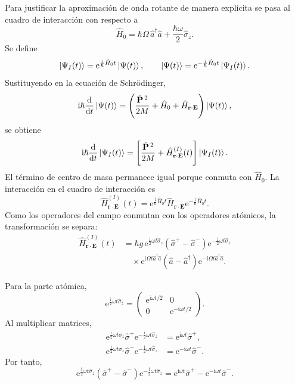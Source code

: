 \documentclass[11pt]{article}
\newcommand{\ii}{\mathrm{i}}
\newcommand{\ee}{\mathrm{e}}
\newcommand{\dd}{\mathrm{d}}
\newcommand{\vb}[1]{\mathbf{#1}}
\newcommand{\adag}{\hat a^\dagger}
\newcommand{\splus}{\hat\sigma^+}
\newcommand{\sminus}{\hat\sigma^-}
\begin{document}
Para justificar la aproximaci\'on de onda rotante de manera expl\'icita se pasa
al cuadro de interacci\'on con respecto a
\begin{equation}
  \hat H_0
  =
  \hbar\Omega\,\adag\hat a
  +
  \frac{\hbar\omega}{2}\hat\sigma_z.
\end{equation}
Se define
\begin{equation}
  \ket{\Psi_I(t)}
  =
  \ee^{\frac{\ii}{\hbar}\hat H_0t}
  \ket{\Psi(t)},
  \qquad
  \ket{\Psi(t)}
  =
  \ee^{-\frac{\ii}{\hbar}\hat H_0t}
  \ket{\Psi_I(t)}.
\end{equation}
Sustituyendo en la ecuaci\'on de Schr\"odinger,
\begin{equation}
  \ii\hbar\frac{\dd}{\dd t}\ket{\Psi(t)}
  =
  \left(
    \frac{\hat{\vb P}^{\,2}}{2M}
    +
    \hat H_0
    +
    \hat H_{\vb r\cdot\vb E}
  \right)
  \ket{\Psi(t)},
\end{equation}
se obtiene
\begin{equation}
  \ii\hbar\frac{\dd}{\dd t}\ket{\Psi_I(t)}
  =
  \left[
    \frac{\hat{\vb P}^{\,2}}{2M}
    +
    \hat H_{\vb r\cdot\vb E}^{(I)}(t)
  \right]
  \ket{\Psi_I(t)}.
\end{equation}
El t\'ermino de centro de masa permanece igual porque conmuta con
\(\hat H_0\). La interacci\'on en el cuadro de interacci\'on es
\begin{equation}
  \hat H_{\vb r\cdot\vb E}^{(I)}(t)
  =
  \ee^{\frac{\ii}{\hbar}\hat H_0t}
  \hat H_{\vb r\cdot\vb E}
  \ee^{-\frac{\ii}{\hbar}\hat H_0t}.
\end{equation}
Como los operadores del campo conmutan con los operadores at\'omicos, la
transformaci\'on se separa:
\begin{align}
  \hat H_{\vb r\cdot\vb E}^{(I)}(t)
  &=
  \hbar g\,
  \ee^{\frac{\ii}{2}\omega t\hat\sigma_z}
  (\splus-\sminus)
  \ee^{-\frac{\ii}{2}\omega t\hat\sigma_z}                                   \\
  &\quad\times
  \ee^{\ii\Omega t\adag\hat a}
  (\hat a-\adag)
  \ee^{-\ii\Omega t\adag\hat a}.
\end{align}

Para la parte at\'omica,
\begin{equation}
  \ee^{\frac{\ii}{2}\omega t\hat\sigma_z}
  =
  \begin{pmatrix}
    \ee^{\ii\omega t/2}&0\\
    0&\ee^{-\ii\omega t/2}
  \end{pmatrix}.
\end{equation}
Al multiplicar matrices,
\begin{align}
  \ee^{\frac{\ii}{2}\omega t\hat\sigma_z}
  \splus
  \ee^{-\frac{\ii}{2}\omega t\hat\sigma_z}
  &=
  \ee^{\ii\omega t}\splus,                                                     \\
  \ee^{\frac{\ii}{2}\omega t\hat\sigma_z}
  \sminus
  \ee^{-\frac{\ii}{2}\omega t\hat\sigma_z}
  &=
  \ee^{-\ii\omega t}\sminus.
\end{align}
Por tanto,
\begin{equation}
  \ee^{\frac{\ii}{2}\omega t\hat\sigma_z}
  (\splus-\sminus)
  \ee^{-\frac{\ii}{2}\omega t\hat\sigma_z}
  =
  \ee^{\ii\omega t}\splus
  -
  \ee^{-\ii\omega t}\sminus.
\end{equation}
\end{document}
